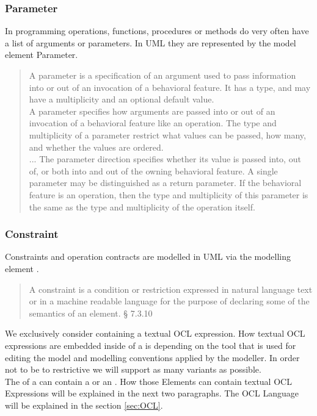 \subsubsection{Parameter} 
In programming operations, functions, procedures or methods do very often have a list of arguments or parameters. In UML they are represented by the model element Parameter.
\begin{quotation}
A parameter is a specification of an argument used to pass information into or out of an invocation of a behavioral feature. It has a type, and may have a multiplicity and an optional default value.\\
A parameter specifies how arguments are passed into or out of an invocation of a behavioral feature like an operation. The
type and multiplicity of a parameter restrict what values can be passed, how many, and whether the values are ordered.\\
...
The parameter direction specifies whether its value is passed into, out of, or both into and out of the owning behavioral
feature. A single parameter may be distinguished as a return parameter. If the behavioral feature is an operation, then the
type and multiplicity of this parameter is the same as the type and multiplicity of the operation itself.
\cite{UML23Superstructure}
\end{quotation}

\subsubsection{Constraint}
\label{sec:Constraint}
Constraints and operation contracts are modelled in UML via the modelling element .
\begin{quotation}
A constraint is a condition or restriction expressed in natural language text or in a machine readable language for the
purpose of declaring some of the semantics of an element.\cite{UML23Superstructure} § 7.3.10
\end{quotation}
We exclusively consider  containing a textual OCL expression. How textual OCL expressions are embedded inside of a  is depending on the tool that is used for editing the model and modelling conventions applied by the modeller. In order not to be to restrictive we will support as many variants as possible.\\ The  of a  can contain a  or an . How those Elements can contain textual OCL Expressions will be explained in the next two paragraphs. The OCL Language will be explained in the section \ref{sec:OCL}.
